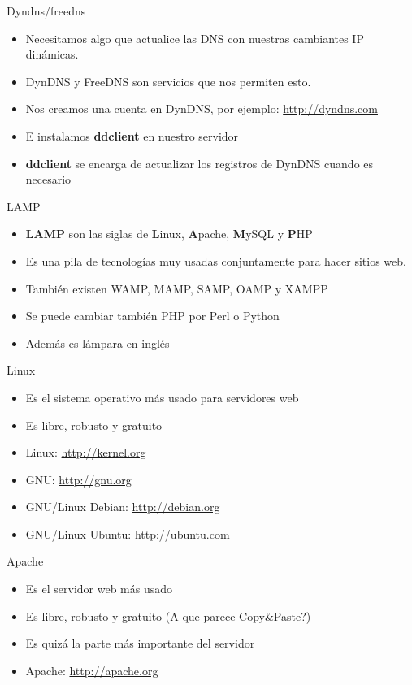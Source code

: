 \documentclass[spanish]{beamer}
\begin{document}
\begin{frame}{Dyndns/freedns}
\begin{itemize}
\item Necesitamos algo que actualice las DNS con nuestras cambiantes IP 
dinámicas.
\item DynDNS y FreeDNS son servicios que nos permiten esto.
\item Nos creamos una cuenta en DynDNS, por ejemplo: \url{http://dyndns.com}
\item E instalamos \textbf{ddclient} en nuestro servidor
\item \textbf{ddclient} se encarga de actualizar los registros de DynDNS
cuando es necesario
\end{itemize}
\end{frame}

\begin{frame}{LAMP}
\begin{itemize}
\item \textbf{LAMP} son las siglas de \textbf{L}inux, \textbf{A}pache, \textbf{M}ySQL y \textbf{P}HP
\item Es una pila de tecnologías muy usadas conjuntamente para hacer sitios web.
\item También existen WAMP, MAMP, SAMP, OAMP y XAMPP
\item Se puede cambiar también PHP por Perl o Python
\item Además es lámpara en inglés
\end{itemize}
\end{frame}

\begin{frame}{Linux}
\begin{itemize}
\item Es el sistema operativo más usado para servidores web
\item Es libre, robusto y gratuito
\item Linux: \url{http://kernel.org}
\item GNU: \url{http://gnu.org}
\item GNU/Linux Debian: \url{http://debian.org}
\item GNU/Linux Ubuntu: \url{http://ubuntu.com}
\end{itemize}
\end{frame}

\begin{frame}{Apache}
\begin{itemize}
\item Es el servidor web más usado
\item Es libre, robusto y gratuito (A que parece Copy\&Paste?)
\item Es quizá la parte más importante del servidor
\item Apache: \url{http://apache.org}
\end{itemize}
\end{frame}
\end{document}

